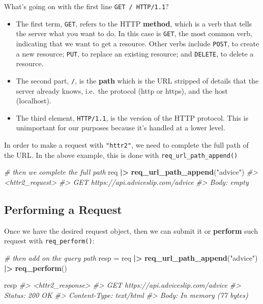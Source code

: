 \documentclass[
]{book}
\newenvironment{Shaded}{\begin{snugshade}}{\end{snugshade}}
\newcommand{\CommentTok}[1]{\textcolor[rgb]{0.56,0.35,0.01}{\textit{#1}}}
\newcommand{\FunctionTok}[1]{\textcolor[rgb]{0.13,0.29,0.53}{\textbf{#1}}}
\newcommand{\NormalTok}[1]{#1}
\newcommand{\OtherTok}[1]{\textcolor[rgb]{0.56,0.35,0.01}{#1}}
\newcommand{\SpecialCharTok}[1]{\textcolor[rgb]{0.81,0.36,0.00}{\textbf{#1}}}
\newcommand{\StringTok}[1]{\textcolor[rgb]{0.31,0.60,0.02}{#1}}
\begin{document}
What's going on with the first line \texttt{GET\ /\ HTTP/1.1}?

\begin{itemize}
\item
  The first term, \texttt{GET}, refers to the HTTP \textbf{method}, which is a
  verb that tells the server what you want to do. In this case is \texttt{GET}, the most
  common verb, indicating that we want to get a resource. Other verbs include
  \texttt{POST}, to create a new resource; \texttt{PUT}, to replace an existing resource; and
  \texttt{DELETE}, to delete a resource.
\item
  The second part, \texttt{/}, is the \textbf{path} which is the URL stripped of details
  that the server already knows, i.e.~the protocol (http or https), and the host
  (localhost).
\item
  The third element, \texttt{HTTP/1.1}, is the version of the HTTP protocol. This is
  unimportant for our purposes because it's handled at a lower level.
\end{itemize}

In order to make a request with \texttt{"httr2"}, we need to complete the full path
of the URL. In the above example, this is done with \texttt{req\_url\_path\_append()}

\begin{Shaded}
\begin{Highlighting}[]
\CommentTok{\# then we complete the full path}
\NormalTok{req }\SpecialCharTok{|\textgreater{}}
  \FunctionTok{req\_url\_path\_append}\NormalTok{(}\StringTok{"advice"}\NormalTok{) }
\CommentTok{\#\textgreater{} \textless{}httr2\_request\textgreater{}}
\CommentTok{\#\textgreater{} GET https://api.adviceslip.com/advice}
\CommentTok{\#\textgreater{} Body: empty}
\end{Highlighting}
\end{Shaded}

\hypertarget{performing-a-request}{%
\subsection{Performing a Request}\label{performing-a-request}}

Once we have the desired request object, then we can submit it or \textbf{perform}
such request with \texttt{req\_perform()}:

\begin{Shaded}
\begin{Highlighting}[]
\CommentTok{\# then add on the query path}
\NormalTok{resp }\OtherTok{=}\NormalTok{ req }\SpecialCharTok{|\textgreater{}}
  \FunctionTok{req\_url\_path\_append}\NormalTok{(}\StringTok{"advice"}\NormalTok{) }\SpecialCharTok{|\textgreater{}}
  \FunctionTok{req\_perform}\NormalTok{()}

\NormalTok{resp}
\CommentTok{\#\textgreater{} \textless{}httr2\_response\textgreater{}}
\CommentTok{\#\textgreater{} GET https://api.adviceslip.com/advice}
\CommentTok{\#\textgreater{} Status: 200 OK}
\CommentTok{\#\textgreater{} Content{-}Type: text/html}
\CommentTok{\#\textgreater{} Body: In memory (77 bytes)}
\end{Highlighting}
\end{Shaded}
\end{document}
